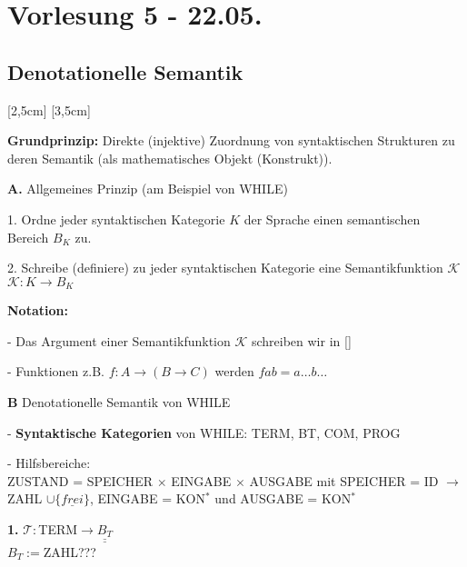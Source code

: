 \section{Vorlesung 5 - 22.05.}
\subsection{Denotationelle Semantik}
[2,5cm]
[3,5cm]

\textbf{Grundprinzip:} Direkte (injektive) Zuordnung von syntaktischen Strukturen zu deren Semantik (als mathematisches Objekt (Konstrukt)).

\begin{compactitem}
	\item[\textbf{A.}] Allgemeines Prinzip (am Beispiel von WHILE)
	\begin{compactitem}
		\item[1.] Ordne jeder syntaktischen Kategorie $K$ der Sprache einen semantischen Bereich $B_K$ zu.
		\item[2.] Schreibe (definiere) zu jeder syntaktischen Kategorie eine Semantikfunktion $\mathcal{K}$\\
		$\mathcal{K}:K \rightarrow B_K$
	\end{compactitem}
	\textbf{Notation:}
	\begin{compactitem}
		\item[-] Das Argument einer Semantikfunktion $\mathcal{K}$ schreiben wir in []
		\item[-] Funktionen z.B. $f: A \rightarrow (B \rightarrow C)$ werden $f a b = a \dots b \dots $ 
	\end{compactitem}
	\item[\textbf{B}] Denotationelle Semantik von WHILE
	\begin{compactitem}
		\item[-] \textbf{Syntaktische Kategorien} von WHILE: TERM, BT, COM, PROG
		\item[-] Hilfsbereiche:\\
		ZUSTAND = SPEICHER $\times$ EINGABE $\times$ AUSGABE mit SPEICHER = ID $\rightarrow$ ZAHL $\cup \{\underline{frei}\}$, EINGABE = KON$^*$ und AUSGABE = KON$^*$
		\item[\textbf{1.}] $\mathcal{T}:$TERM$\rightarrow \underline{\underline{B_T}}$\\
		$B_T :=$ZAHL???\\
\end{compactitem}
\end{compactitem}
